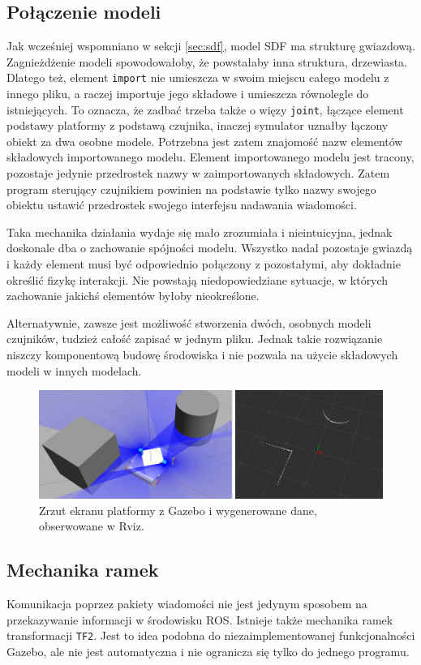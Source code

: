 	\subsection{Połączenie modeli}
		Jak wcześniej wspomniano w sekcji \ref{sec:sdf},
		model SDF ma strukturę gwiazdową. 
		Zagnieżdżenie modeli spowodowałoby, że powstałaby inna struktura, drzewiasta.
		Dlatego też, element \texttt{import} nie umieszcza w swoim miejscu całego modelu z innego pliku, a raczej importuje jego składowe i umieszcza równolegle do istniejących.
		To oznacza, że zadbać trzeba także o więzy \texttt{joint}, łączące element podstawy platformy z podstawą czujnika, inaczej symulator uznałby łączony obiekt za dwa osobne modele.
		Potrzebna jest zatem znajomość nazw elementów składowych importowanego modelu.
		Element importowanego modelu jest tracony, pozostaje jedynie przedrostek nazwy w zaimportowanych składowych.
		Zatem program sterujący czujnikiem powinien na podstawie tylko nazwy swojego obiektu ustawić przedrostek swojego interfejsu nadawania wiadomości.

		Taka mechanika działania wydaje się mało zrozumiała i nieintuicyjna, jednak doskonale dba o zachowanie spójności modelu.
		Wszystko nadal pozostaje gwiazdą i każdy element musi być odpowiednio połączony z pozostałymi, aby dokładnie określić fizykę interakcji.
		Nie powstają niedopowiedziane sytuacje, w których zachowanie jakichś elementów byłoby nieokreślone.

		Alternatywnie, zawsze jest możliwość stworzenia dwóch, osobnych modeli czujników, tudzież całość zapisać w jednym pliku.
		Jednak takie rozwiązanie niszczy komponentową budowę środowiska i nie pozwala na użycie składowych modeli w innych modelach.
		
		\begin{figure}[h]
		\centering
		\includegraphics[width=\textwidth]{graphics/scan.png}
		\caption{Zrzut ekranu platformy z Gazebo i wygenerowane dane, obserwowane w Rviz.}
		\label{fig:scan}
		\end{figure}
		
	\subsection{Mechanika ramek}
		\label{sec:frames}
		Komunikacja poprzez pakiety wiadomości nie jest jedynym sposobem na przekazywanie informacji w środowisku ROS.
		Istnieje także mechanika ramek transformacji \texttt{TF2}.
		Jest to idea podobna do niezaimplementowanej funkcjonalności Gazebo, ale nie jest automatyczna i nie ogranicza się tylko do jednego programu.
		
